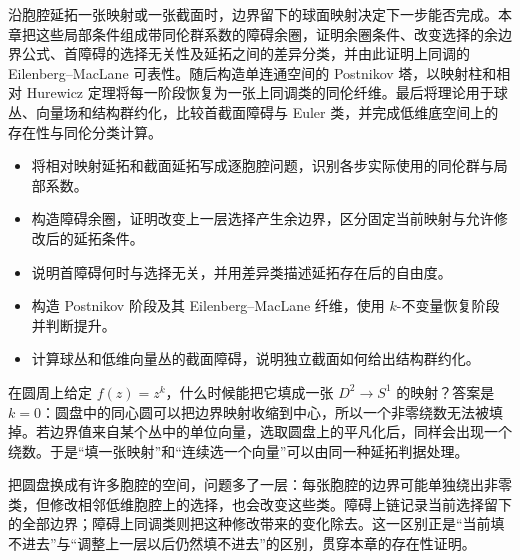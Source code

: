 
% 
% 


\begin{chapterabstract}
	沿胞腔延拓一张映射或一张截面时，边界留下的球面映射决定下一步能否完成。本章把这些局部条件组成带同伦群系数的障碍余圈，证明余圈条件、改变选择的余边界公式、首障碍的选择无关性及延拓之间的差异分类，并由此证明上同调的 Eilenberg–MacLane 可表性。随后构造单连通空间的 Postnikov 塔，以映射柱和相对 Hurewicz 定理将每一阶段恢复为一张上同调类的同伦纤维。最后将理论用于球丛、向量场和结构群约化，比较首截面障碍与 Euler 类，并完成低维底空间上的存在性与同伦分类计算。
\end{chapterabstract}

\begin{learninggoals}
	\begin{itemize}
		\item 将相对映射延拓和截面延拓写成逐胞腔问题，识别各步实际使用的同伦群与局部系数。
		\item 构造障碍余圈，证明改变上一层选择产生余边界，区分固定当前映射与允许修改后的延拓条件。
		\item 说明首障碍何时与选择无关，并用差异类描述延拓存在后的自由度。
		\item 构造 Postnikov 阶段及其 Eilenberg–MacLane 纤维，使用 \(k\)-不变量恢复阶段并判断提升。
		\item 计算球丛和低维向量丛的截面障碍，说明独立截面如何给出结构群约化。
	\end{itemize}
\end{learninggoals}

在圆周上给定 \(f(z)=z^k\)，什么时候能把它填成一张 \(D^2\to S^1\) 的映射？答案是 \(k=0\)：圆盘中的同心圆可以把边界映射收缩到中心，所以一个非零绕数无法被填掉。若边界值来自某个丛中的单位向量，选取圆盘上的平凡化后，同样会出现一个绕数。于是“填一张映射”和“连续选一个向量”可以由同一种延拓判据处理。

\ProseParagraphBreak

把圆盘换成有许多胞腔的空间，问题多了一层：每张胞腔的边界可能单独绕出非零类，但修改相邻低维胞腔上的选择，也会改变这些类。障碍上链记录当前选择留下的全部边界；障碍上同调类则把这种修改带来的变化除去。这一区别正是“当前填不进去”与“调整上一层以后仍然填不进去”的区别，贯穿本章的存在性证明。

